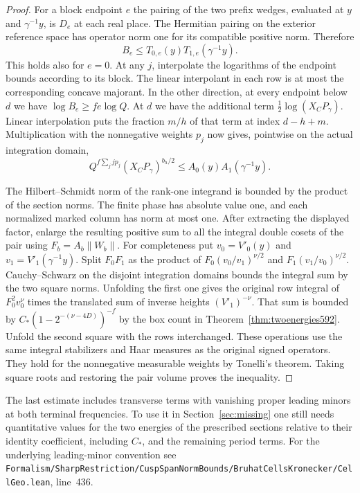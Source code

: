 \documentclass[a4paper,11pt]{article}
\theoremstyle{definition}
\theoremstyle{remark}
\newcommand{\srcloc}[2]{{\small\nolinkurl{#1.lean}}, line~#2}
\numberwithin{equation}{section}
\begin{document}
\begin{proof}
For a block endpoint \(e\) the pairing of the two prefix wedges,
evaluated at \(y\) and \(\gamma^{-1}y\), is \(D_e\) at each real
place. The Hermitian pairing on the exterior reference space has
operator norm one for its compatible positive norm. Therefore
\[
              B_e\le T_{0,e}(y)T_{1,e}(\gamma^{-1}y).
\]
This holds also for \(e=0\). At any \(j\), interpolate the logarithms
of the endpoint bounds according to its block. The linear
interpolant in each row is at most the corresponding concave
majorant. In the other direction, at every endpoint below \(d\)
we have \(\log B_e\ge fe\log Q\). At \(d\) we have the additional
term \(\tfrac12\log(X_C P_\gamma)\). Linear interpolation puts
the fraction \(m/h\) of that term at index \(d-h+m\).
Multiplication with the nonnegative weights \(p_j\) now gives,
pointwise on the actual integration domain,
\[
 Q^{f\sum_j j p_j}(X_C P_\gamma)^{b_h/2}
      \le A_0(y)A_1(\gamma^{-1}y).
\]

The Hilbert--Schmidt norm of the rank-one integrand is bounded by
the product of the section norms. The finite phase has absolute
value one, and each normalized marked column has norm at most one.
After extracting the displayed factor, enlarge the resulting
positive sum to all the integral double cosets of the pair using
\(F_b=A_b\|W_b\|\). For completeness put \(v_0=V'_0(y)\) and
\(v_1=V'_1(\gamma^{-1}y)\). Split \(F_0F_1\) as the product of
\(F_0(v_0/v_1)^{\nu/2}\) and \(F_1(v_1/v_0)^{\nu/2}\).
Cauchy--Schwarz on the disjoint integration domains bounds the
integral sum by the two square norms. Unfolding the first one
gives the original row integral of \(F_0^2v_0^\nu\) times the
translated sum of inverse heights \( (V'_1)^{-\nu}\).
That sum is bounded by \(C_*(1-2^{-(\nu-4D)})^{-f}\) by the box
count in Theorem~\ref{thm:twoenergies592}. Unfold the second
square with the rows interchanged. These operations use the same
integral stabilizers and Haar measures as the original signed
operators. They hold for the nonnegative measurable weights by
Tonelli's theorem. Taking square roots and restoring the pair
volume proves the inequality.
\end{proof}

The last estimate includes transverse terms with vanishing proper
leading minors at both terminal frequencies. To use it in
Section~\ref{sec:missing} one still needs quantitative values for the
two energies of the prescribed sections relative to their identity
coefficient, including \(C_*\), and the remaining period terms.
For the underlying leading-minor convention see
\srcloc{Formalism/SharpRestriction/CuspSpanNormBounds/BruhatCellsKronecker/CellGeo}{436}.
\end{document}
